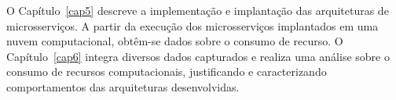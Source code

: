 O Capítulo~\ref{cap5} descreve a implementação e implantação das arquiteturas de microsserviços.
%
A partir da execução dos microsserviços implantados em uma nuvem computacional, obtêm-se dados sobre o consumo de recurso.
%
O Capítulo~\ref{cap6} integra diversos dados capturados e realiza uma análise sobre o consumo de recursos computacionais, justificando e caracterizando comportamentos das arquiteturas desenvolvidas.

